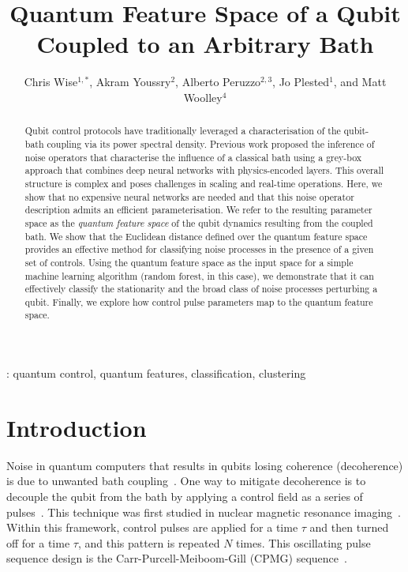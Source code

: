 \documentclass[12pt]{iopart}
\begin{document}
\title[Quantum Feature Space of a Qubit Coupled to an Arbitrary Bath]{Quantum Feature Space of a Qubit Coupled to an Arbitrary Bath}

\author{Chris Wise$^{1,*}$, Akram Youssry$^{2}$, Alberto Peruzzo$^{2,3}$, Jo Plested$^{1}$, and Matt Woolley$^4$}

\address{$^1$School of Systems and Computing, UNSW, Canberra, ACT, 2601, Australia}
\address{$^2$Quantum Photonics Laboratory and Centre for Quantum Computation and Communication Technology, RMIT University, Melbourne, VIC 3000, Australia}
\address{$^3$Quandela, Massy, France}
\address{$^4$School of Engineering and Technology and Centre for Engineered Quantum Systems, UNSW, Canberra, ACT, 2601, Australia}
\address{$^*$Author to whom any correspondence should be addressed.}

\begin{abstract}
 Qubit control protocols have traditionally leveraged a characterisation of the qubit-bath coupling via its power spectral density. Previous work proposed the inference of noise operators that characterise the influence of a classical bath using a grey-box approach that combines deep neural networks with physics-encoded layers. This overall structure is complex and poses challenges in scaling and real-time operations. Here, we show that no expensive neural networks are needed and that this noise operator description admits an efficient parameterisation. We refer to the resulting parameter space as the \textit{quantum feature space} of the qubit dynamics resulting from the coupled bath. We show that the Euclidean distance defined over the quantum feature space provides an effective method for classifying noise processes in the presence of a given set of controls. Using the quantum feature space as the input space for a simple machine learning algorithm (random forest, in this case), we demonstrate that it can effectively classify the stationarity and the broad class of noise processes perturbing a qubit. Finally, we explore how control pulse parameters map to the quantum feature space.
\end{abstract}

\vspace{2pc}
:  quantum control, quantum features, classification, clustering

\section{Introduction}
Noise in quantum computers that results in qubits losing coherence (decoherence) is due to unwanted bath coupling~\cite{bravyi2018correcting}. One way to mitigate decoherence is to decouple the qubit from the bath by applying a control field as a series of pulses~\cite{viola1999dynamical}. This technique was first studied in nuclear magnetic resonance imaging~\cite{degen2017quantum, boss2016one}. Within this framework, control pulses are applied for a time $\tau$ and then turned off for a time $\tau$, and this pattern is repeated $N$ times. This oscillating pulse sequence design is the Carr-Purcell-Meiboom-Gill (CPMG) sequence~\cite{carr1954effects, meiboom1958modified}.
\end{document}
